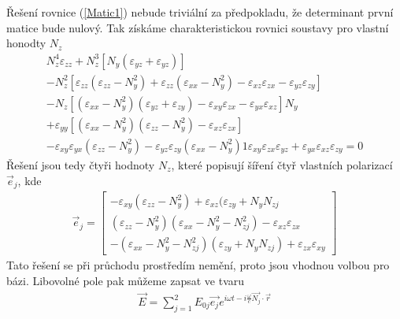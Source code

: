 Řešení rovnice (\ref{Matic1}) nebude triviální za předpokladu, že determinant první matice bude nulový. Tak získáme charakteristickou rovnici soustavy pro vlastní honodty $N_z$
\begin{eqnarray}
N_z^4\varepsilon_{zz}+N_z^3[N_y(\varepsilon_{yz}+\varepsilon_{yz})]\\
-N_z^2[\varepsilon_{zz}(\varepsilon_{zz}-N_y^2)+\varepsilon_{zz}(\varepsilon_{xx}-N_y^2)-\varepsilon_{xz}\varepsilon_{zx}-\varepsilon_{yz}\varepsilon_{zy}]\\
-N_z[(\varepsilon_{xx}-N_y^2)(\varepsilon_{yz}+\varepsilon_{zy})-\varepsilon_{xy}\varepsilon_{zx}-\varepsilon_{yx}\varepsilon_{xz}]N_y \\
+\varepsilon_{yy}[(\varepsilon_{xx}-N_y^2)(\varepsilon_{zz}-N_y^2)-\varepsilon_{xz}\varepsilon_{zx}]\\
-\varepsilon_{xy}\varepsilon_{yx}(\varepsilon_{zz}-N_y^2)-\varepsilon_{yz}\varepsilon_{zy}(\varepsilon_{xx}-N_y^2)1\varepsilon_{xy}\varepsilon_{zx}\varepsilon_{yz}+\varepsilon_{yx}\varepsilon_{xz}\varepsilon_{zy}=0
\end{eqnarray}
Řešení jsou tedy čtyři hodnoty $N_z$, které popisují šíření čtyř vlastních polarizací $\vec{e}_j$, kde
\begin{eqnarray}
\vec{e}_j=
\begin{bmatrix}
-\varepsilon_{xy}(\varepsilon_{zz}-N_y^2)+\varepsilon_{xz}(\varepsilon_{zy}+N_yN_{zj} \\
(\varepsilon_{zz}-N_y^2)(\varepsilon_{xx}-N_y^2-N^2_{zj})-\varepsilon_{xz}\varepsilon_{zx} \\
-(\varepsilon_{xx}-N_y^2-N^2_{zj})(\varepsilon_{zy}+N_yN_{zj})+\varepsilon_{zx}\varepsilon_{xy}
\end{bmatrix}
\end{eqnarray}
Tato řešení se při průchodu prostředím nemění, proto jsou vhodnou volbou pro bázi. Libovolné pole pak můžeme zapsat ve tvaru
\begin{eqnarray}
\vec{E}=\sum_{j=1}^2E_{0j}\vec{e_j}e^{i\omega t-i\frac{\omega}{c}\vec{N_j}\cdot\vec{r}}
\label{Rozpis E}
\end{eqnarray}

